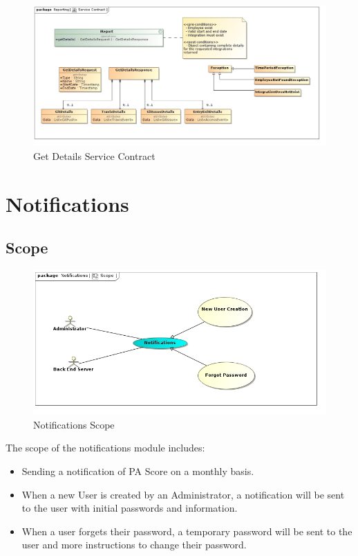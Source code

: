 \documentclass[11pt,a4paper]{article}
\begin{document}
\begin{figure}[H]
	\begin{center}
		\includegraphics[scale=0.45]{../Images/GetDetails Service Contract.jpg}
		\caption{Get Details Service Contract}
	\end{center}
\end{figure}





\pagebreak

\section{Notifications}
\subsection{Scope}
\begin{figure}[H]
	\begin{center}
		\includegraphics[scale=0.6]{../Images/Notification Scope.jpg}
		\caption{Notifications Scope}
	\end{center}
\end{figure}
The scope of the notifications module includes:
\begin{itemize}
	\item Sending a notification of PA Score on a monthly basis.
	\item When a new User is created by an Administrator, a notification will be sent to the user with initial passwords and information.
	\item When a user forgets their password, a temporary password will be sent to the user and more instructions to change their password.
\end{itemize}
\end{document}
